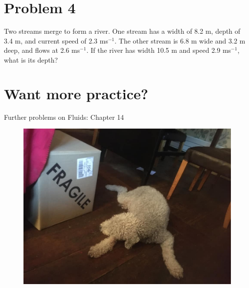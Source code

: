 \documentclass[11pt]{article}
\begin{document}
\section*{Problem 4}

Two streams merge to form a river. One stream has a width of 8.2 m, depth of 3.4 m, and current speed of 2.3 ms$^{-1}$. The other stream is 6.8 m wide and 3.2 m deep, and flows at 2.6 ms$^{-1}$. If the river has width 10.5 m and speed 2.9 ms$^{-1}$, what is its depth?

\section*{Want more practice?}
\small
Further problems on Fluids: Chapter 14 \\



\begin{figure}[h]
\includegraphics[scale=0.15]{sploot.jpg}
\end{figure}
\end{document}
